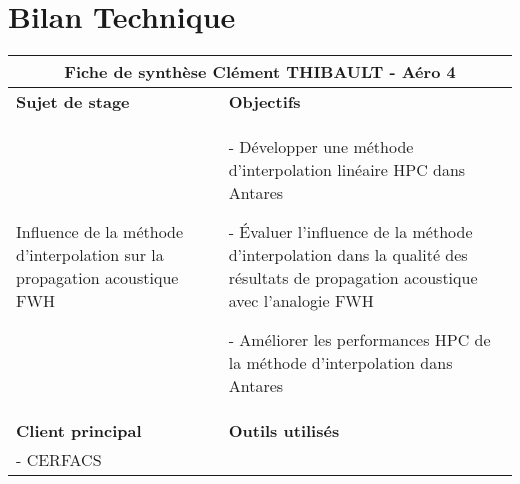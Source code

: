 \section*{Bilan Technique}
\begin{table}[ht]
\centering
\begin{tabular}{|p{6.5cm}|p{8.5cm}|}
\hline


\multicolumn{2}{|c|}{\textbf{Fiche de synthèse}   \hspace{7cm}   Clément THIBAULT - Aéro 4} \\ 
\hline
\textbf{Sujet de stage} & \textbf{Objectifs} \\ 
\hline


\begin{minipage}[t]{6.5cm}
Influence de la méthode d’interpolation sur la propagation acoustique FWH
\end{minipage} & 
\begin{minipage}[t]{8.5cm}
- Développer une méthode d’interpolation linéaire HPC dans Antares

- Évaluer l’influence de la méthode d’interpolation dans la qualité des résultats de propagation acoustique avec l’analogie FWH

- Améliorer les performances HPC de la méthode d’interpolation dans Antares
\end{minipage} \\ 
\hline
\textbf{Client principal} & \textbf{Outils utilisés} \\ 
\hline
\begin{minipage}[t]{6.5cm}
- CERFACS


\end{minipage}
\end{tabular}
\end{table}

